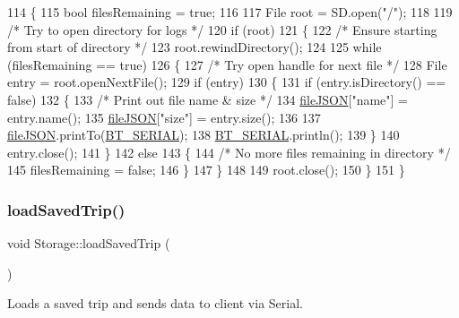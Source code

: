 \begin{DoxyCode}
114 \{
115   \textcolor{keywordtype}{bool} filesRemaining = \textcolor{keyword}{true};
116 
117   File root = SD.open(\textcolor{stringliteral}{"/"});
118 
119   \textcolor{comment}{/* Try to open directory for logs */}
120   \textcolor{keywordflow}{if} (root)
121   \{
122     \textcolor{comment}{/* Ensure starting from start of directory */}
123     root.rewindDirectory();
124 
125     \textcolor{keywordflow}{while} (filesRemaining == \textcolor{keyword}{true})
126     \{
127       \textcolor{comment}{/* Try open handle for next file */}
128       File entry = root.openNextFile();
129       \textcolor{keywordflow}{if} (entry)
130       \{
131         \textcolor{keywordflow}{if} (entry.isDirectory() == \textcolor{keyword}{false})
132         \{
133           \textcolor{comment}{/* Print out file name & size */}
134           \hyperlink{class_storage_ac503241aaa812f9b8ee36dd10cbd915a}{fileJSON}[\textcolor{stringliteral}{"name"}] = entry.name();
135           \hyperlink{class_storage_ac503241aaa812f9b8ee36dd10cbd915a}{fileJSON}[\textcolor{stringliteral}{"size"}] = entry.size();
136 
137           \hyperlink{class_storage_ac503241aaa812f9b8ee36dd10cbd915a}{fileJSON}.printTo(\hyperlink{_storage_8cpp_ad1e6e6f6fc813b305067b9e1b0777ea6}{BT\_SERIAL});
138           \hyperlink{_storage_8cpp_ad1e6e6f6fc813b305067b9e1b0777ea6}{BT\_SERIAL}.println();
139         \}
140         entry.close();
141       \}
142       \textcolor{keywordflow}{else}
143       \{
144         \textcolor{comment}{/* No more files remaining in directory */}
145         filesRemaining = \textcolor{keyword}{false};
146       \}
147     \}
148 
149     root.close();
150   \}
151 \}
\end{DoxyCode}
\mbox{\label{class_storage_af56ca8289ed925300e3385114c561eec}} 
\subsubsection{\texorpdfstring{load\+Saved\+Trip()}{loadSavedTrip()}}
{\footnotesize\ttfamily void Storage\+::load\+Saved\+Trip (\begin{DoxyParamCaption}{ }\end{DoxyParamCaption})}



Loads a saved trip and sends data to client via Serial. 

